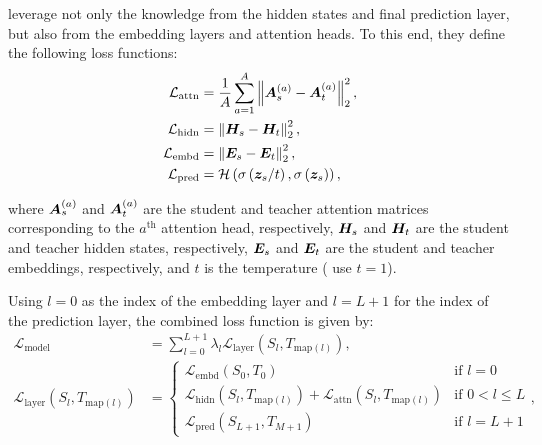 \citet{jiao2019tinybert} leverage not only the knowledge from the hidden states and final prediction layer, but also from the embedding layers and attention heads. To this end, they define the following loss functions:
\begin{align}
    \mathcal{L}_{\text{attn}} &= \frac{1}{A} \sum_{a=1}^A \norm{\vect{A}_s^{(a)} - \vect{A}_t^{(a)}}_2^2, \\
    \label{eq:attention_mse}
    \mathcal{L}_{\text{hidn}} &= \norm{\vect{H}_s - \vect{H}_t}_2^2, \\
    \mathcal{L}_{\text{embd}} &= \norm{\vect{E}_s - \vect{E}_t}_2^2, \\
    \mathcal{L}_{\text{pred}} &= \ce{\softmax{\vect{z}_s / t}, \softmax{\vect{z}_s}},
\end{align}

where $\vect{A}_s^{(a)}$ and $\vect{A}_t^{(a)}$ are the student and teacher attention matrices corresponding to the $a^{\text{th}}$ attention head, respectively, $\vect{H}_s$ and $\vect{H}_t$ are the student and teacher hidden states, respectively, $\vect{E}_s$ and $\vect{E}_t$ are the student and teacher embeddings, respectively, and $t$ is the temperature (\citet{jiao2019tinybert} use $t = 1$).

Using $l=0$ as the index of the embedding layer and $l = L + 1$ for the index of the prediction layer, the combined loss function is given by:
\begin{align}
    \mathcal{L}_{\text{model}} &= \sum_{l=0}^{L+1} \lambda_l \mathcal{L}_{\text{layer}} \left( S_l, T_{\text{map}(l)} \right), \\
    \mathcal{L}_{\text{layer}} \left( S_l, T_{\text{map}(l)} \right) &= \begin{cases}
        \mathcal{L}_{\text{embd}} \left( S_0, T_0 \right) & \text{if } l = 0 \\
        \mathcal{L}_{\text{hidn}} \left( S_l, T_{\text{map}(l)} \right) + \mathcal{L}_{\text{attn}} \left( S_l, T_{\text{map}(l)} \right) & \text{if } 0 < l \leq L \\
        \mathcal{L}_{\text{pred}} \left( S_{L+1}, T_{M+1} \right) & \text{if } l = L + 1
    \end{cases},
\end{align}

